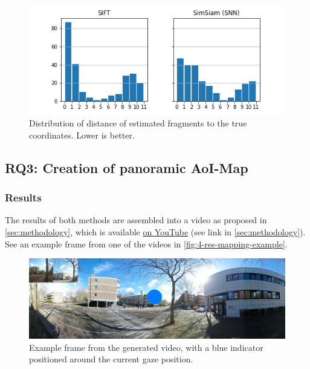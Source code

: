 \documentclass[sigconf, natbib=false, nonacm]{acmart}
\begin{document}
    \begin{figure}
        \includegraphics[width=\linewidth]{figures/4-res-deviation-distribution.png}
        \caption{Distribution of distance of estimated fragments to the true coordinates. Lower is better.}
        \label{fig:4-res-deviation-distribution}
    \end{figure} 
    
    \subsection{RQ3: Creation of panoramic AoI-Map}\label{sec:res-RQ3}
        \subsubsection{Results}
        The results of both methods are assembled into a video as proposed in \autoref{sec:methodology}, which is available \href{https://www.youtube.com/playlist?list=PLzh4mA3kUCz2J9pJhzKEI88LiCYvB9BQk}{on YouTube} (see link in \autoref{sec:methodology}). See an example frame from one of the videos in \autoref{fig:4-res-mapping-example}.  
        
        \begin{figure}
            \includegraphics[width=\linewidth]{figures/4-res-mapping-example.png}
            \caption{Example frame from the generated video, with a blue indicator positioned around the current gaze position.}
            \label{fig:4-res-mapping-example}
        \end{figure} 
        
\end{document}
